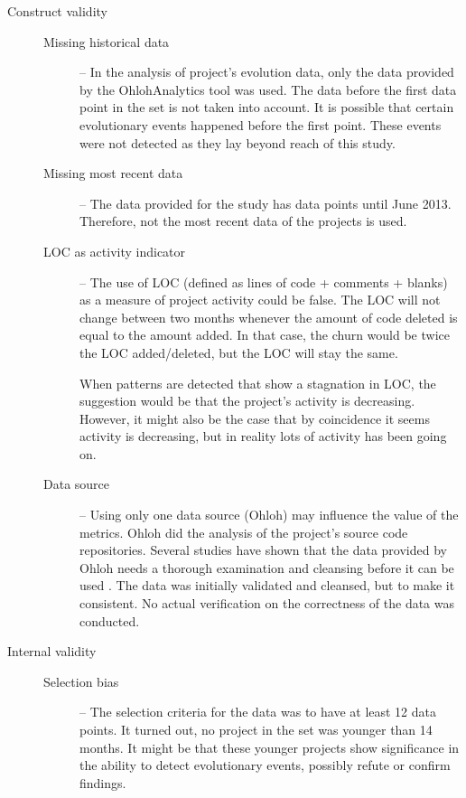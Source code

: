 \begin{description}
	\item[Construct validity] \hfill
	
	\begin{description}
		\item[\rm{Missing historical data}] -- In the analysis of project's
			evolution data, only the data provided by the OhlohAnalytics tool
			\cite{ohlohanalytics, bruntink2013} was used.
			The data before the first data point in the set is not taken into account. It
			is possible that certain evolutionary events happened before the first point.
			These events were not detected as they lay beyond reach of this study.

		\item[\rm{Missing most recent data}] -- The data provided for the study has
			data points until June 2013. Therefore, not the most recent data of the
			projects is used.

		\item[\rm{LOC as activity indicator}] -- The use of LOC (defined as
			lines of code + comments + blanks) as a measure of project activity could be
			false. The LOC will not change between two months whenever the amount of code
			deleted is equal to the amount added. In that case, the churn would be twice
			the LOC added/deleted, but the LOC will stay the same.

			When patterns are detected that show a stagnation in LOC, the suggestion
			would be that the project's activity is decreasing. However, it might also
			be the case that by coincidence it seems activity is decreasing, but in
			reality lots of activity has been going on.

		\item[\rm{Data source}] -- Using only one data source (Ohloh) may
			influence the value of the metrics. Ohloh did the analysis of the project's
			source code repositories. Several studies have shown that the data provided
			by Ohloh needs a thorough examination and cleansing before it can be used
			\cite{bruntink2013, ohlohanalytics, bruntink2014}. The data was initially
			validated and cleansed, but to make it consistent. No actual verification on
			the correctness of the data was conducted.
	\end{description}

	\item[Internal validity] \hfill

	\begin{description}
		\item[\rm{Selection bias}] -- The selection criteria for the data was to have
			at least 12 data points. It turned out, no project in the set was younger
			than 14 months. It might be that these younger projects show significance in
			the ability to detect evolutionary events, possibly refute or confirm
			findings.
	\end{description}


\end{description}
